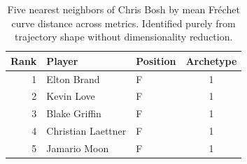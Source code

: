 \begin{table}[htbp]
  \centering\small
  \begin{tabular}{rllc}
    \toprule
    Rank & Player & Position & Archetype \\
    \midrule
    1 & Elton Brand & F & 1 \\
    2 & Kevin Love & F & 1 \\
    3 & Blake Griffin & F & 1 \\
    4 & Christian Laettner & F & 1 \\
    5 & Jamario Moon & F & 1 \\
    \bottomrule
  \end{tabular}
  \caption{Five nearest neighbors of Chris Bosh by mean Fr\'{e}chet curve distance across metrics. Identified purely from trajectory shape without dimensionality reduction.}
  \label{tab:Chris_Bosh_frechet_curve_neighbors}
\end{table}

